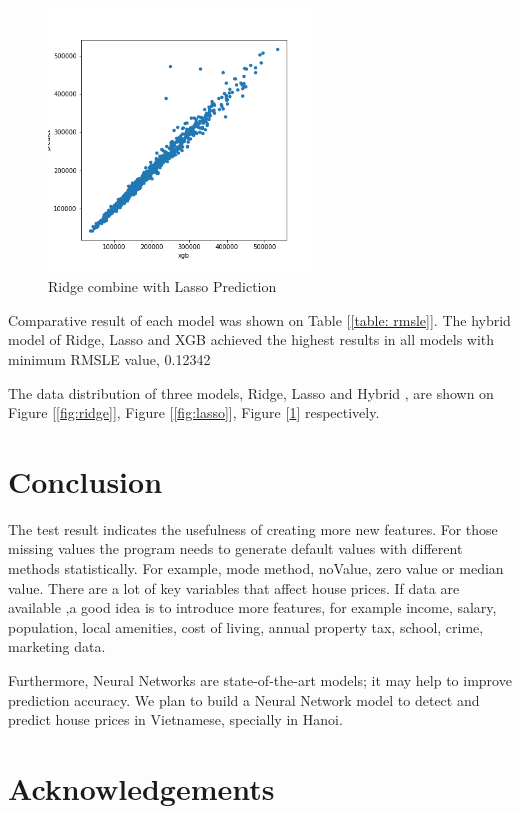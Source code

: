 \documentclass[11pt,a4paper]{article}
\begin{document}
\begin{figure}
    \centering
    \includegraphics[width=7cm]{images/predict.png}
    \caption{Ridge combine with Lasso Prediction}
    \label{fig:predict}
\end{figure}


Comparative result of each model was shown on Table [\ref{table: rmsle}]. The hybrid model of Ridge, Lasso and XGB achieved the highest results in all models with minimum RMSLE value, 0.12342

The data distribution of three models, Ridge, Lasso and Hybrid , are shown on Figure [\ref{fig:ridge}], Figure [\ref{fig:lasso}], Figure [\ref{fig:predict}] respectively.

\section{Conclusion}

The test result indicates the usefulness of creating more new features. For those missing values the program needs to generate default values with different methods statistically. For example, mode method, noValue, zero value or median value.  There are a lot of key variables that affect house prices. If data are available ,a good idea is to introduce more features, for example income, salary, population, local amenities, cost of living, annual property tax, school, crime, marketing data.

Furthermore, Neural Networks are state-of-the-art models; it may help to improve prediction accuracy. We plan to build a Neural Network model to detect and predict house prices in Vietnamese, specially in Hanoi.

\section*{Acknowledgements}
\end{document}
